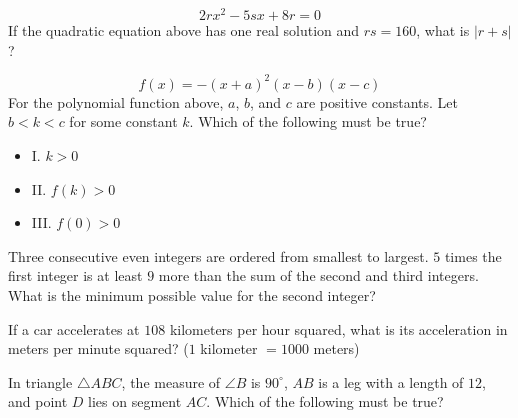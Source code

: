 \vspace{2em}
\newpage

\noindent\markforreview
\vspace{1em}

\[
2rx^{2} - 5sx + 8r = 0
\]
If the quadratic equation above has one real solution and \(rs = 160\), what is \(\lvert r + s \rvert\)?

\vspace{2em}
\newpage

\noindent\markforreview
\vspace{1em}

\[
f(x) = -(x + a)^{2}(x - b)(x - c)
\]
For the polynomial function above, \(a\), \(b\), and \(c\) are positive constants. Let \(b < k < c\) for some constant \(k\). Which of the following must be true?

\begin{itemize}
\item I. \(k > 0\)
\item II. \(f(k) > 0\)
\item III. \(f(0) > 0\)
\end{itemize}

\vspace{0.75em}


\vspace{2em}
\newpage

\noindent\markforreview
\vspace{1em}

Three consecutive even integers are ordered from smallest to largest. \(5\) times the first integer is at least \(9\) more than the sum of the second and third integers. What is the minimum possible value for the second integer?

\vspace{2em}
\newpage

\noindent\markforreview
\vspace{1em}

If a car accelerates at \(108\) kilometers per hour squared, what is its acceleration in meters per minute squared? (\(1\) kilometer \(= 1000\) meters)

\vspace{2em}
\newpage

\noindent\markforreview
\vspace{1em}

In triangle \(\triangle ABC\), the measure of \(\angle B\) is \(90^\circ\), \(AB\) is a leg with a length of \(12\), and point \(D\) lies on segment \(AC\). Which of the following must be true?

